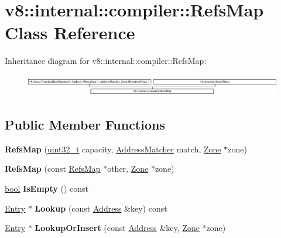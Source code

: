 \hypertarget{classv8_1_1internal_1_1compiler_1_1RefsMap}{}\section{v8\+:\+:internal\+:\+:compiler\+:\+:Refs\+Map Class Reference}
\label{classv8_1_1internal_1_1compiler_1_1RefsMap}
Inheritance diagram for v8\+:\+:internal\+:\+:compiler\+:\+:Refs\+Map\+:\begin{figure}[H]
\begin{center}
\leavevmode
\includegraphics[height=0.954003cm]{classv8_1_1internal_1_1compiler_1_1RefsMap}
\end{center}
\end{figure}
\subsection*{Public Member Functions}
\begin{DoxyCompactItemize}
\item 
\mbox{\label{classv8_1_1internal_1_1compiler_1_1RefsMap_a02654ab2261d4a0ac8e95386678c68ab}} 
{\bfseries Refs\+Map} (\mbox{\hyperlink{classuint32__t}{uint32\+\_\+t}} capacity, \mbox{\hyperlink{classv8_1_1internal_1_1compiler_1_1AddressMatcher}{Address\+Matcher}} match, \mbox{\hyperlink{classv8_1_1internal_1_1Zone}{Zone}} $\ast$zone)
\item 
\mbox{\label{classv8_1_1internal_1_1compiler_1_1RefsMap_af139687d4b9e8ad794b190add3f384a6}} 
{\bfseries Refs\+Map} (const \mbox{\hyperlink{classv8_1_1internal_1_1compiler_1_1RefsMap}{Refs\+Map}} $\ast$other, \mbox{\hyperlink{classv8_1_1internal_1_1Zone}{Zone}} $\ast$zone)
\item 
\mbox{\label{classv8_1_1internal_1_1compiler_1_1RefsMap_a21565817f40fa4ef949923ddc410fbed}} 
\mbox{\hyperlink{classbool}{bool}} {\bfseries Is\+Empty} () const
\item 
\mbox{\label{classv8_1_1internal_1_1compiler_1_1RefsMap_a77b4979dc0876eb2b2719b096743bb99}} 
\mbox{\hyperlink{structv8_1_1base_1_1TemplateHashMapEntry}{Entry}} $\ast$ {\bfseries Lookup} (const \mbox{\hyperlink{classuintptr__t}{Address}} \&key) const
\item 
\mbox{\label{classv8_1_1internal_1_1compiler_1_1RefsMap_a97a283d08b257359ef16e6834b54a97f}} 
\mbox{\hyperlink{structv8_1_1base_1_1TemplateHashMapEntry}{Entry}} $\ast$ {\bfseries Lookup\+Or\+Insert} (const \mbox{\hyperlink{classuintptr__t}{Address}} \&key, \mbox{\hyperlink{classv8_1_1internal_1_1Zone}{Zone}} $\ast$zone)
\end{DoxyCompactItemize}
